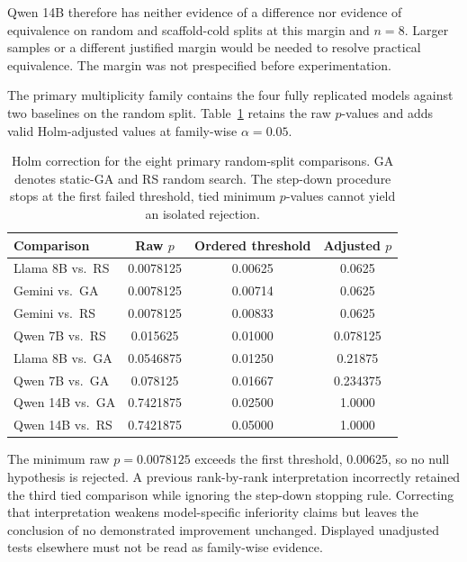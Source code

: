Qwen 14B therefore has neither evidence of a difference nor evidence of equivalence on random and scaffold-cold splits at this margin and $n=8$. Larger samples or a different justified margin would be needed to resolve practical equivalence. The margin was not prespecified before experimentation.

The primary multiplicity family contains the four fully replicated models against two baselines on the random split. Table~\ref{tab:holm} retains the raw $p$-values and adds valid Holm-adjusted values at family-wise $\alpha=0.05$.

\begin{table}[htbp]
\caption{Holm correction for the eight primary random-split comparisons. GA denotes static-GA and RS random search. The step-down procedure stops at the first failed threshold, tied minimum $p$-values cannot yield an isolated rejection.}
\label{tab:holm}
\centering
\begin{tabular}{@{}lccc@{}}
\toprule
Comparison & Raw $p$ & Ordered threshold & Adjusted $p$ \\
\midrule
Llama 8B vs.\ RS & 0.0078125 & 0.00625 & 0.0625 \\
Gemini vs.\ GA & 0.0078125 & 0.00714 & 0.0625 \\
Gemini vs.\ RS & 0.0078125 & 0.00833 & 0.0625 \\
Qwen 7B vs.\ RS & 0.015625 & 0.01000 & 0.078125 \\
Llama 8B vs.\ GA & 0.0546875 & 0.01250 & 0.21875 \\
Qwen 7B vs.\ GA & 0.078125 & 0.01667 & 0.234375 \\
Qwen 14B vs.\ GA & 0.7421875 & 0.02500 & 1.0000 \\
Qwen 14B vs.\ RS & 0.7421875 & 0.05000 & 1.0000 \\
\bottomrule
\end{tabular}
\end{table}

The minimum raw $p=0.0078125$ exceeds the first threshold, 0.00625, so no null hypothesis is rejected. A previous rank-by-rank interpretation incorrectly retained the third tied comparison while ignoring the step-down stopping rule. Correcting that interpretation weakens model-specific inferiority claims but leaves the conclusion of no demonstrated improvement unchanged. Displayed unadjusted tests elsewhere must not be read as family-wise evidence.

